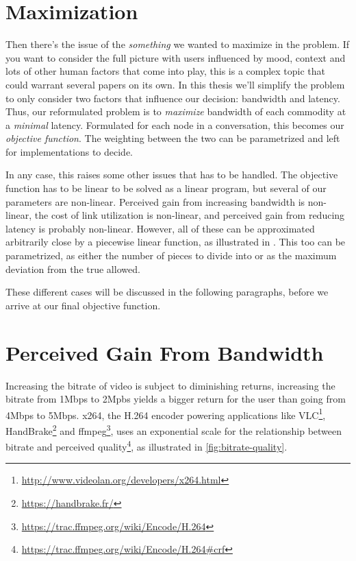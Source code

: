 \section{Maximization}

Then there's the issue of the \emph{something} we wanted to maximize in the problem. If you want to consider the full picture with users influenced by mood, context and lots of other human factors that come into play, this is a complex topic that could warrant several papers on its own. In this thesis we'll simplify the problem to only consider two factors that influence our decision: bandwidth and latency. Thus, our reformulated problem is to \emph{maximize} bandwidth of each commodity at a \emph{minimal} latency. Formulated for each node in a conversation, this becomes our \emph{objective function}. The weighting between the two can be parametrized and left for implementations to decide.

In any case, this raises some other issues that has to be handled. The objective function has to be linear to be solved as a linear program, but several of our parameters are non-linear. Perceived gain from increasing bandwidth is non-linear, the cost of link utilization is non-linear, and perceived gain from reducing latency is probably non-linear. However, all of these can be approximated arbitrarily close by a piecewise linear function, as illustrated in . This too can be parametrized, as either the number of pieces to divide into or as the maximum deviation from the true allowed.

These different cases will be discussed in the following paragraphs, before we arrive at our final objective function.


\section{Perceived Gain From Bandwidth}

Increasing the bitrate of video is subject to diminishing returns, increasing the bitrate from 1Mbps to 2Mpbs yields a bigger return for the user than going from 4Mbps to 5Mbps. x264, the H.264 encoder powering applications like VLC\footnote{\url{http://www.videolan.org/developers/x264.html}}, HandBrake\footnote{\url{https://handbrake.fr/}} and ffmpeg\footnote{\url{https://trac.ffmpeg.org/wiki/Encode/H.264}}, uses an exponential scale for the relationship between bitrate and perceived quality\footnote{\url{https://trac.ffmpeg.org/wiki/Encode/H.264\#crf}}, as illustrated in \autoref{fig:bitrate-quality}.

